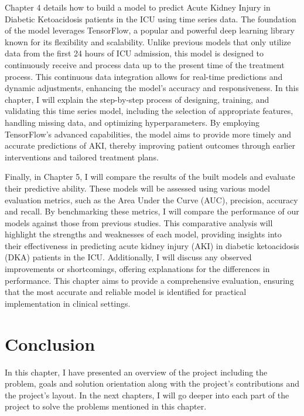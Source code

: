 \documentclass[../main.tex]{subfiles}
\begin{document}
Chapter 4 details how to build a model to predict Acute Kidney Injury in Diabetic Ketoacidosis patients in the ICU using time series data. 
The foundation of the model leverages TensorFlow, a popular and powerful deep learning library known for its flexibility and scalability. 
Unlike previous models that only utilize data from the first 24 hours of ICU admission, this model is designed to continuously receive and process data up to the present time of the treatment process. 
This continuous data integration allows for real-time predictions and dynamic adjustments, enhancing the model's accuracy and responsiveness. 
In this chapter, I will explain the step-by-step process of designing, training, and validating this time series model, including the selection of appropriate features, handling missing data, and optimizing hyperparameters. 
By employing TensorFlow's advanced capabilities, the model aims to provide more timely and accurate predictions of AKI, thereby improving patient outcomes through earlier interventions and tailored treatment plans.

Finally, in Chapter 5, I will compare the results of the built models and evaluate their predictive ability. 
These models will be assessed using various model evaluation metrics, such as the Area Under the Curve (AUC), precision, accuracy and recall. 
By benchmarking these metrics, I will compare the performance of our models against those from previous studies. 
This comparative analysis will highlight the strengths and weaknesses of each model, providing insights into their effectiveness in predicting acute kidney injury (AKI) in diabetic ketoacidosis (DKA) patients in the ICU. 
Additionally, I will discuss any observed improvements or shortcomings, offering explanations for the differences in performance. 
This chapter aims to provide a comprehensive evaluation, ensuring that the most accurate and reliable model is identified for practical implementation in clinical settings.


\section{Conclusion}
In this chapter, I have presented an overview of the project including the problem, goals and solution orientation along with the project's contributions and the project's layout.
In the next chapters, I will go deeper into each part of the project to solve the problems mentioned in this chapter.
\end{document}
